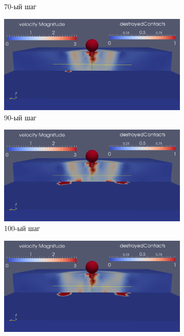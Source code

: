 \begin{figure}[H]
\begin{subfigure}[b]{0.5\textwidth}
\caption{70-ый шаг}
\end{subfigure}
\begin{subfigure}[b]{0.5\textwidth}
\centering
\includegraphics[width=1.0\textwidth]{png/delamination/single_clip/90.png}
\caption{90-ый шаг}
\end{subfigure}
\begin{subfigure}[b]{0.5\textwidth}
\centering
\includegraphics[width=1.0\textwidth]{png/delamination/single_clip/100.png}
\caption{100-ый шаг}
\end{subfigure}
\begin{subfigure}[b]{0.5\textwidth}
\centering
\includegraphics[width=1.0\textwidth]{png/delamination/single_clip/120.png}

\end{subfigure}
\end{figure}
